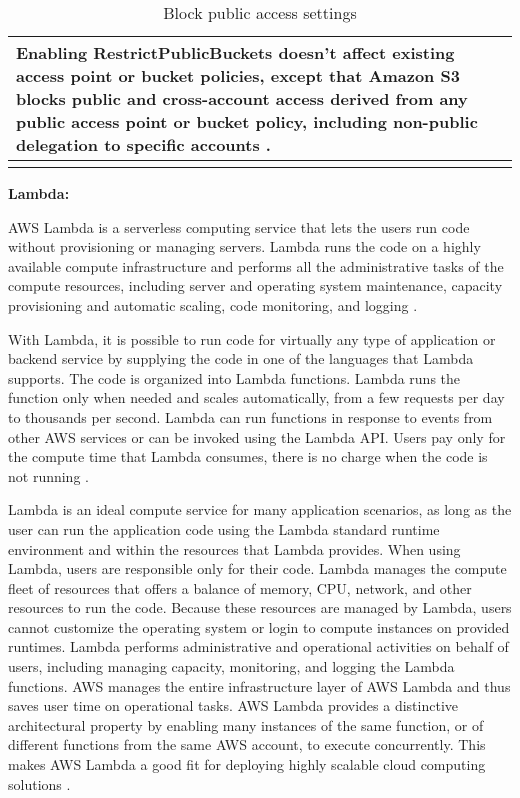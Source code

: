 {\begin{longtable}{|p{5cm}|p{11.4cm}|}
    Enabling RestrictPublicBuckets doesn't affect existing access point or bucket policies, except that Amazon S3 blocks public and cross-account access derived from any public access point or bucket policy, including non-public delegation to specific accounts \cite{23}.  \\
    \hline
    \caption{Block public access settings}
    \label{tab:blockpublicaccesssettings}
\end{longtable}




\textbf{Lambda:}
\par AWS Lambda is a serverless computing service that lets the users run code without provisioning or managing servers. Lambda runs the code on a highly available compute infrastructure and performs all the administrative tasks of the compute resources, including server and operating system maintenance, capacity provisioning and automatic scaling, code monitoring, and logging \cite{38}.

\par With Lambda, it is possible to run code for virtually any type of application or backend service by supplying the code in one of the languages that Lambda supports. The code is organized into Lambda functions. Lambda runs the function only when needed and scales automatically, from a few requests per day to thousands per second. Lambda can run functions in response to events from other AWS services or can be invoked using the Lambda API. Users pay only for the compute time that Lambda consumes, there is no charge when the code is not running \cite{27}.

\par Lambda is an ideal compute service for many application scenarios, as long as the user can run the application code using the Lambda standard runtime environment and within the resources that Lambda provides. When using Lambda, users are responsible only for their code. Lambda manages the compute fleet of resources that offers a balance of memory, CPU, network, and other resources to run the code. Because these resources are managed by Lambda, users cannot customize the operating system or login to compute instances on provided runtimes. Lambda performs administrative and operational activities on behalf of users, including managing capacity, monitoring, and logging the Lambda functions. AWS manages the entire infrastructure layer of AWS Lambda and thus saves user time on operational tasks. AWS Lambda provides a distinctive architectural property by enabling many instances of the same function, or of different functions from the same AWS account, to execute concurrently. This makes AWS Lambda a good fit for deploying highly scalable cloud computing solutions \cite{39}.

}
